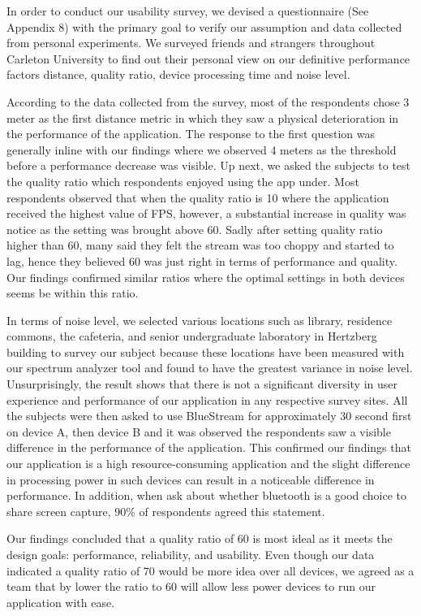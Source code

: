 \documentclass[a4paper,12pt]{article}
\begin{document}
In order to conduct our usability survey, we devised a questionnaire (See Appendix 8) with the primary goal to verify our assumption and data collected from personal experiments. We surveyed friends and strangers throughout Carleton University to find out their personal view on our definitive performance factors distance, quality ratio, device processing time and noise level.

According to the data collected from the survey, most of the respondents chose 3 meter as the first distance metric in which they saw a physical deterioration in the performance of the application. The response to the first question was generally inline with our findings where we observed 4 meters as the threshold before a performance decrease was visible. Up next, we asked the subjects to test the quality ratio which respondents enjoyed using the app under. Most respondents observed that when the quality ratio is 10 where the application received the highest value of FPS, however, a substantial increase in quality was notice as the setting was brought above 60. Sadly after setting quality ratio higher than 60, many said they felt the stream was too choppy and started to lag, hence they believed 60 was just right in terms of performance and quality. Our findings confirmed similar ratios where the optimal settings in both devices seems be within this ratio.

In terms of noise level, we selected various locations such as library, residence commons, the cafeteria, and senior undergraduate laboratory in Hertzberg building to survey our subject because these locations have been measured with our spectrum analyzer tool and found to have the greatest variance in noise level. Unsurprisingly, the result shows that there is not a significant diversity in user experience and performance of our application in any respective survey sites. All the subjects were then asked to use BlueStream for approximately 30 second first on device A, then device B and it was observed the respondents saw a visible difference in the performance of the application. This confirmed our findings that our application is a high resource-consuming application and the slight difference in processing power in such devices can result in a noticeable difference in performance. In addition, when ask about whether bluetooth is a good choice to share screen capture, 90\% of respondents agreed this statement.

Our findings concluded that a quality ratio of 60 is most ideal as it meets the design goals: performance, reliability, and usability. Even though our data indicated a quality ratio of 70 would be more idea over all devices, we agreed as a team that by lower the ratio to 60 will allow less power devices to run our application with ease. 
\end{document}
